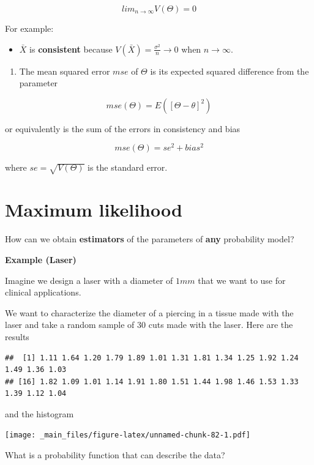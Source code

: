 \documentclass[
]{book}
\providecommand{\tightlist}{%
  \setlength{\itemsep}{0pt}\setlength{\parskip}{0pt}}
\begin{document}
\[lim_{n\rightarrow \infty} V(\Theta) = 0\]

For example:

\begin{itemize}
\tightlist
\item
  \(\bar{X}\) is \textbf{consistent} because \(V(\bar{X})=\frac{\sigma^2}{n}\rightarrow 0\) when \(n \rightarrow \infty\).
\end{itemize}

\begin{enumerate}
\def\labelenumi{\arabic{enumi}.}
\setcounter{enumi}{2}
\tightlist
\item
  The mean squared error \(mse\) of \(\Theta\) is its expected squared difference from the parameter
\end{enumerate}

\[mse(\Theta)=E([\Theta - \theta]^2)\]

or equivalently is the sum of the errors in consistency and bias

\[mse(\Theta)=se^2 + bias^2\]

where \(se=\sqrt{V(\Theta)}\) is the standard error.

\hypertarget{maximum-likelihood-1}{%
\section{Maximum likelihood}\label{maximum-likelihood-1}}

How can we obtain \textbf{estimators} of the parameters of \textbf{any} probability model?

\textbf{Example (Laser)}

Imagine we design a laser with a diameter of \(1mm\) that we want to use for clinical applications.

We want to characterize the diameter of a piercing in a tissue made with the laser and take a random sample of \(30\) cuts made with the laser. Here are the results

\begin{verbatim}
##  [1] 1.11 1.64 1.20 1.79 1.89 1.01 1.31 1.81 1.34 1.25 1.92 1.24 1.49 1.36 1.03
## [16] 1.82 1.09 1.01 1.14 1.91 1.80 1.51 1.44 1.98 1.46 1.53 1.33 1.39 1.12 1.04
\end{verbatim}

and the histogram

\texttt{[image: \_main\_files/figure-latex/unnamed-chunk-82-1.pdf]}

What is a probability function that can describe the data?
\end{document}
